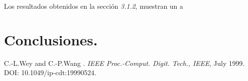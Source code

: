 \documentclass[12pt,a4paper]{article} %
\begin{document}
Los resultados obtenidos en la sección \textit{3.1.2}, muestran un a

\section{Conclusiones.}


\begin{thebibliography}{3}


C.-L.Wey and C.-P.Wang
.
\newblock \emph{IEEE Proc.-Comput. Digit. Tech., IEEE}, July 1999.
\newblock DOI: 10.1049/ip-cdt:19990524.

\end{thebibliography}
\end{document}
